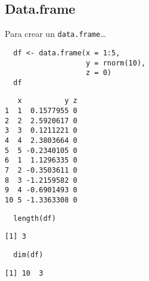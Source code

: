\documentclass[xcolor={usenames,svgnames,dvipsnames}]{beamer}
\begin{document}
\subsection{Data.frame}
\label{sec:org081041a}
\begin{frame}[fragile,label={sec:org1d91b14}]{Para crear un \texttt{data.frame}\ldots{}}
 \lstset{language=r,label= ,caption= ,captionpos=b,numbers=none}
\begin{lstlisting}
  df <- data.frame(x = 1:5,
                   y = rnorm(10),
                   z = 0)
  df
\end{lstlisting}

\begin{verbatim}
   x          y z
1  1  0.1577955 0
2  2  2.5920617 0
3  3  0.1211221 0
4  4  2.3803664 0
5  5 -0.2340105 0
6  1  1.1296335 0
7  2 -0.3503611 0
8  3 -1.2159582 0
9  4 -0.6901493 0
10 5 -1.3363308 0
\end{verbatim}

\lstset{language=r,label= ,caption= ,captionpos=b,numbers=none}
\begin{lstlisting}
  length(df)
\end{lstlisting}

\begin{verbatim}
[1] 3
\end{verbatim}

\lstset{language=r,label= ,caption= ,captionpos=b,numbers=none}
\begin{lstlisting}
  dim(df)
\end{lstlisting}

\begin{verbatim}
[1] 10  3
\end{verbatim}
\end{frame}
\end{document}
